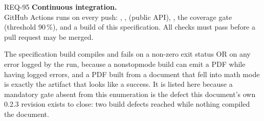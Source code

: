 \begin{reqbox}{REQ-95}{\stable}
\textbf{Continuous integration.}\\
GitHub Actions runs on every push: ,
,  (public API),
, the coverage gate (threshold 90\,\%), and a build of this
specification. All checks must pass before a pull request may be merged.

The specification build compiles  and fails on a
non-zero exit status OR on any error logged by the run, because a
nonstopmode build can emit a PDF while having logged errors, and a PDF
built from a document that fell into math mode is exactly the artifact
that looks like a success. It is listed here because a mandatory gate
absent from this enumeration is the defect this document's own 0.2.3
revision exists to close: two build defects reached  while
nothing compiled the document.
\end{reqbox}

